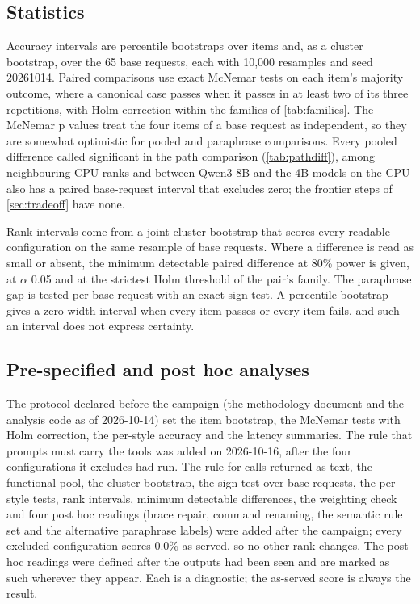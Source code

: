 \documentclass[11pt]{article}
\begin{document}
\subsection{Statistics}\label{sec:stats}

Accuracy intervals are percentile bootstraps over items and, as a cluster bootstrap, over the 65 base requests, each with 10,000 resamples and seed 20261014. Paired comparisons use exact McNemar tests on each item's majority outcome, where a canonical case passes when it passes in at least two of its three repetitions, with Holm correction within the families of \cref{tab:families}. The McNemar p values treat the four items of a base request as independent, so they are somewhat optimistic for pooled and paraphrase comparisons. Every pooled difference called significant in the path comparison (\cref{tab:pathdiff}), among neighbouring CPU ranks and between Qwen3-8B and the 4B models on the CPU also has a paired base-request interval that excludes zero; the frontier steps of \cref{sec:tradeoff} have none.

Rank intervals come from a joint cluster bootstrap that scores every readable configuration on the same resample of base requests. Where a difference is read as small or absent, the minimum detectable paired difference at 80\% power is given, at $\alpha$ 0.05 and at the strictest Holm threshold of the pair's family. The paraphrase gap is tested per base request with an exact sign test. A percentile bootstrap gives a zero-width interval when every item passes or every item fails, and such an interval does not express certainty.

\subsection{Pre-specified and post hoc analyses}\label{sec:prespec}

The protocol declared before the campaign (the methodology document and the analysis code as of 2026-10-14) set the item bootstrap, the McNemar tests with Holm correction, the per-style accuracy and the latency summaries. The rule that prompts must carry the tools was added on 2026-10-16, after the four configurations it excludes had run. The rule for calls returned as text, the functional pool, the cluster bootstrap, the sign test over base requests, the per-style tests, rank intervals, minimum detectable differences, the weighting check and four post hoc readings (brace repair, command renaming, the semantic rule set and the alternative paraphrase labels) were added after the campaign; every excluded configuration scores 0.0\% as served, so no other rank changes. The post hoc readings were defined after the outputs had been seen and are marked as such wherever they appear. Each is a diagnostic; the as-served score is always the result.
\end{document}
